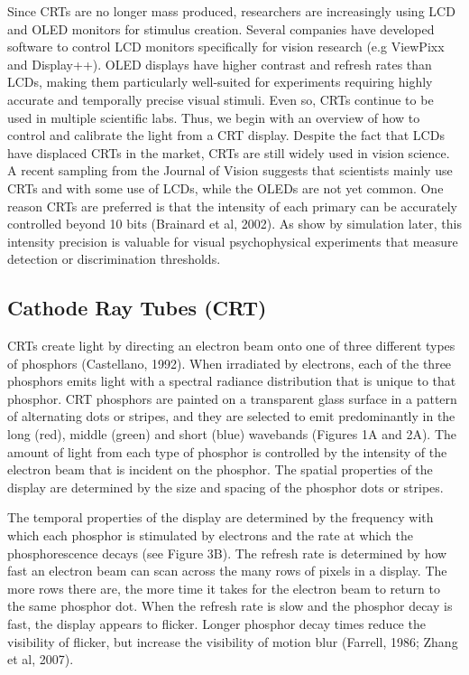 \documentclass[
  letterpaper,
]{book}
\begin{document}
Since CRTs are no longer mass produced, researchers are increasingly
using LCD and OLED monitors for stimulus creation. Several companies
have developed software to control LCD monitors specifically for vision
research (e.g ViewPixx and Display++). OLED displays have higher
contrast and refresh rates than LCDs, making them particularly
well-suited for experiments requiring highly accurate and temporally
precise visual stimuli. Even so, CRTs continue to be used in multiple
scientific labs. Thus, we begin with an overview of how to control and
calibrate the light from a CRT display. Despite the fact that LCDs have
displaced CRTs in the market, CRTs are still widely used in vision
science. A recent sampling from the Journal of Vision suggests that
scientists mainly use CRTs and with some use of LCDs, while the OLEDs
are not yet common. One reason CRTs are preferred is that the intensity
of each primary can be accurately controlled beyond 10 bits (Brainard et
al, 2002). As show by simulation later, this intensity precision is
valuable for visual psychophysical experiments that measure detection or
discrimination thresholds.

\subsection{Cathode Ray Tubes (CRT)}\label{cathode-ray-tubes-crt}

CRTs create light by directing an electron beam onto one of three
different types of phosphors (Castellano, 1992). When irradiated by
electrons, each of the three phosphors emits light with a spectral
radiance distribution that is unique to that phosphor. CRT phosphors are
painted on a transparent glass surface in a pattern of alternating dots
or stripes, and they are selected to emit predominantly in the long
(red), middle (green) and short (blue) wavebands (Figures 1A and 2A).
The amount of light from each type of phosphor is controlled by the
intensity of the electron beam that is incident on the phosphor. The
spatial properties of the display are determined by the size and spacing
of the phosphor dots or stripes.

The temporal properties of the display are determined by the frequency
with which each phosphor is stimulated by electrons and the rate at
which the phosphorescence decays (see Figure 3B). The refresh rate is
determined by how fast an electron beam can scan across the many rows of
pixels in a display. The more rows there are, the more time it takes for
the electron beam to return to the same phosphor dot. When the refresh
rate is slow and the phosphor decay is fast, the display appears to
flicker. Longer phosphor decay times reduce the visibility of flicker,
but increase the visibility of motion blur (Farrell, 1986; Zhang et al,
2007).
\end{document}
